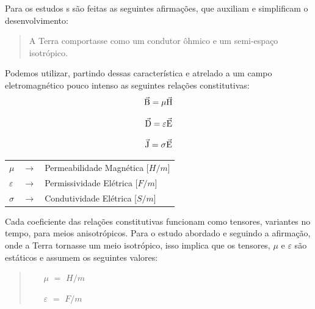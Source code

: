         Para os estudos \mt s são feitas as seguintes afirmações, que auxiliam e simplificam o desenvolvimento:
       
        \begin{quote}
            A Terra comportasse como um condutor ôhmico e um semi-espaço isotrópico.
        \end{quote}
        
        Podemos utilizar, partindo dessas característica e atrelado a um campo eletromagnético pouco intenso as seguintes relações constitutivas:
        \begin{equation}
         \vec{\textrm{B}} = \mu \vec{\textrm{H}}
        \end{equation}
        
        \begin{equation}
         \vec{\textrm{D}} = \varepsilon \vec{\textrm{E}}
        \end{equation}
        
        \begin{equation}
         \vec{\textrm{J}} = \sigma \vec{\textrm{E}}
        \end{equation}

        {\footnotesize \noindent
            \begin{table}[H]
                \begin{tabular*}{1cm}{p{0.05cm}p{0.1cm}p{10cm}}
                    {\footnotesize $\mu$}          & {\footnotesize $\rightarrow$} & {\footnotesize Permeabilidade Magnética [$H/m$] }\\
                    {\footnotesize $\varepsilon$}  & {\footnotesize $\rightarrow$} & {\footnotesize Permissividade Elétrica [$F/m$] }\\
                    {\footnotesize $\sigma$}       & {\footnotesize $\rightarrow$} & {\footnotesize Condutividade Elétrica [$S/m$]} \\
                \end{tabular*}
            \end{table}}

        \noindent Cada coeficiente das relações constitutivas funcionam como tensores, variantes no tempo, para meios anisotrópicos. Para o estudo abordado e seguindo a afirmação, onde a Terra tornasse um meio isotrópico, isso implica que os tensores, $\mu$ e $\varepsilon$ são estáticos e assumem os seguintes valores:
        
        \begin{quote}
            \begin{enumerate}
                \item[$\mu$] $=$ $H/m$
                \item[$\varepsilon$] $=$ $F/m$
            \end{enumerate}
        \end{quote}
        
